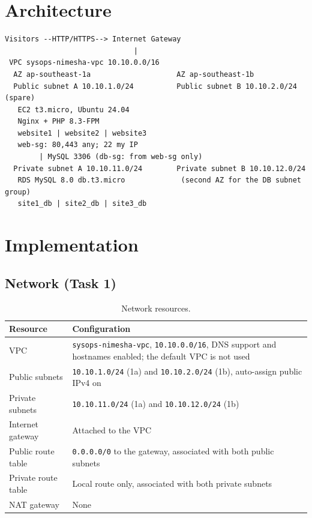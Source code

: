 \documentclass[11pt,a4paper]{article}
\newcommand{\code}[1]{\texttt{#1}}
\begin{document}
\section{Architecture}
\begin{lstlisting}
Visitors --HTTP/HTTPS--> Internet Gateway
                              |
 VPC sysops-nimesha-vpc 10.10.0.0/16
  AZ ap-southeast-1a                    AZ ap-southeast-1b
  Public subnet A 10.10.1.0/24          Public subnet B 10.10.2.0/24 (spare)
   EC2 t3.micro, Ubuntu 24.04
   Nginx + PHP 8.3-FPM
   website1 | website2 | website3
   web-sg: 80,443 any; 22 my IP
        | MySQL 3306 (db-sg: from web-sg only)
  Private subnet A 10.10.11.0/24        Private subnet B 10.10.12.0/24
   RDS MySQL 8.0 db.t3.micro             (second AZ for the DB subnet group)
   site1_db | site2_db | site3_db
\end{lstlisting}

\section{Implementation}
\subsection{Network (Task 1)}
\begin{table}[H]
\centering
\begin{tabular}{@{}p{3.6cm}p{11cm}@{}}
\toprule
\textbf{Resource} & \textbf{Configuration}\\
\midrule
VPC & \code{sysops-nimesha-vpc}, \code{10.10.0.0/16}, DNS support and hostnames enabled; the default VPC is not used\\
Public subnets & \code{10.10.1.0/24} (1a) and \code{10.10.2.0/24} (1b), auto-assign public IPv4 on\\
Private subnets & \code{10.10.11.0/24} (1a) and \code{10.10.12.0/24} (1b)\\
Internet gateway & Attached to the VPC\\
Public route table & \code{0.0.0.0/0} to the gateway, associated with both public subnets\\
Private route table & Local route only, associated with both private subnets\\
NAT gateway & None\\
\bottomrule
\end{tabular}
\caption{Network resources.}
\end{table}
\end{document}
